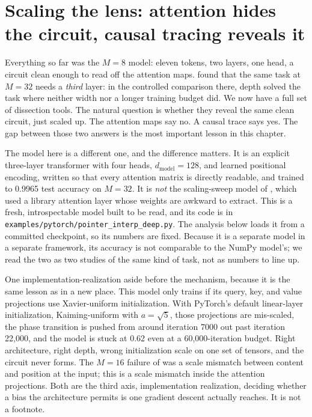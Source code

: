 
\section[Scaling the lens: attention hides the circuit]{Scaling the lens:
attention hides the circuit, causal tracing reveals it}\label{sec:scaling-the-lens}

Everything so far was the $M = 8$ model: eleven tokens, two layers, one head, a
circuit clean enough to read off the attention maps.  found
that the same task at $M = 32$ needs a \emph{third} layer: in the controlled
comparison there, depth solved the task where neither width nor a longer training
budget did. We now have a full set of
dissection tools. The natural question is whether they reveal the same clean
circuit, just scaled up. The attention maps say no. A causal trace says yes. The
gap between those two answers is the most important lesson in this chapter.

The model here is a different one, and the difference matters. It is an explicit
three-layer transformer with four heads, $d_{\text{model}} = 128$, and learned
positional encoding, written so that every attention matrix is directly readable,
and trained to 0.9965 test accuracy on $M = 32$. It is \emph{not} the scaling-sweep
model of , which used a library attention layer whose
weights are awkward to extract. This is a fresh, introspectable model built to be
read, and its code is in \texttt{examples/pytorch/pointer\_interp\_deep.py}. The
analysis below loads it from a committed checkpoint, so its numbers are fixed.
Because it is a separate model in a separate framework, its accuracy is not
comparable to the NumPy model's; we read the two as two studies of the same kind
of task, not as numbers to line up.

One implementation-realization aside before the mechanism, because it is the same
lesson as  in a new place. This model only trains if its
query, key, and value projections use Xavier-uniform initialization. With
PyTorch's default linear-layer initialization, Kaiming-uniform with
$a = \sqrt{5}$, those projections are mis-scaled, the phase transition is pushed
from around iteration 7000 out past iteration 22{,}000, and the model is stuck at
0.62 even at a 60{,}000-iteration budget. Right architecture, right depth, wrong
initialization scale on one set of tensors, and the circuit never forms. The
$M = 16$ failure of  was a scale mismatch between content
and position at the input; this is a scale mismatch inside the attention
projections. Both are the third axis, implementation realization, deciding
whether a bias the architecture permits is one gradient descent actually reaches.
It is not a footnote.

